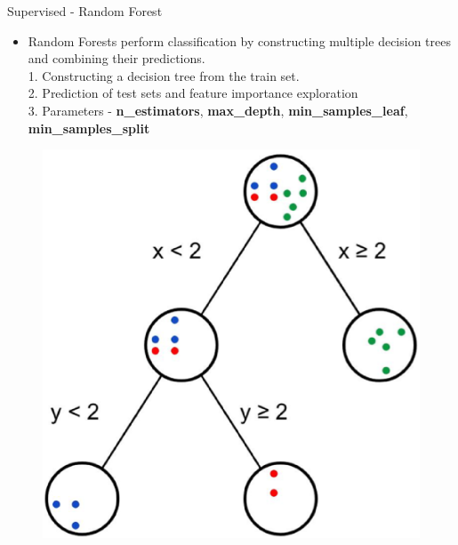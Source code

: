 \documentclass[
 size=14pt,
 paper=smartboard,  %
 mode=present, 		%
 display=slides, 	%
 style=tuliplab,  	%
 pauseslide,
 fleqn,leqno]{powerdot}
\begin{document}
\begin{slide}[toc=,bm=]{Supervised - Random Forest}
		\begin{itemize}
		\item
	Random Forests perform classification by constructing multiple decision trees and combining their predictions.\\
	1. Constructing a decision tree from the train set.\\
	2. Prediction of test sets and feature importance exploration\\
	3. Parameters - \textbf{n_estimators}, \textbf{max_depth}, \textbf{min_samples_leaf}, \textbf{min_samples_split}
\end{itemize}

	\begin{figure}
		\centering
		\includegraphics[scale=0.3]{rf.eps}
	\end{figure}
\end{slide}
\end{document}
